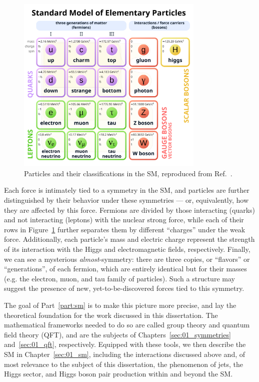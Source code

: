 \begin{figure}[ht!]
	\centering
	\includegraphics[width=0.8\textwidth]{figures/01-SM/sm_diagram.png}
	\caption{Particles and their classifications in the SM, reproduced from Ref.~\cite{enwiki:1238968997}.}
	\label{fig:01_sm}
\end{figure}

Each force is intimately tied to a symmetry in the SM, and particles are further distinguished by their behavior under these symmetries --- or, equivalently, how they are affected by this force.
Fermions are divided by those interacting (quarks) and not interacting (leptons) with the nuclear strong force, while each of their rows in Figure~\ref{fig:01_sm} further separates them by different ``charges'' under the weak force.
Additionally, each particle's mass and electric charge represent the strength of its interaction with the Higgs and electromagnetic fields, respectively.
Finally, we can see a mysterious \textit{almost}-symmetry: there are three copies, or ``flavors'' or ``generations'', of each fermion, which are entirely identical but for their masses (e.g. the electron, muon, and tau family of particles).
Such a structure may suggest the presence of new, yet-to-be-discovered forces tied to this symmetry.

The goal of Part~\ref{part:sm} is to make this picture more precise, and lay the theoretical foundation for the work discussed in this dissertation.
The mathematical frameworks needed to do so are called group theory and quantum field theory (QFT), and are the subjects of Chapters~\ref{sec:01_symmetries} and~\ref{sec:01_qft}, respectively.
Equipped with these tools, we then describe the SM in Chapter~\ref{sec:01_sm}, including the interactions discussed above and, of most relevance to the subject of this dissertation, the phenomenon of jets, the Higgs sector, and Higgs boson pair production within and beyond the SM.

